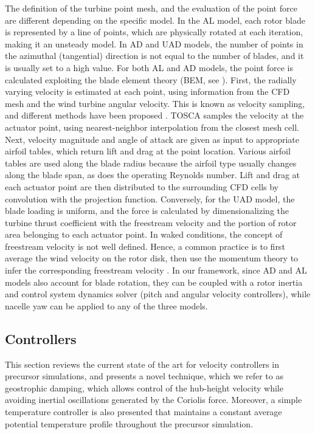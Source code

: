 \documentclass[journal abbreviation, manuscript]{copernicus}
\begin{document}
The definition of the turbine point mesh, and the evaluation of the point force are different depending on the specific model. In the AL model, each rotor blade is represented by a line of points, which are physically rotated at each iteration, making it an unsteady model. In AD and UAD models, the number of points in the azimuthal (tangential) direction is not equal to the number of blades, and it is usually set to a high value. For both AL and AD models, the point force is calculated exploiting the blade element theory (BEM, see \citealp{1935_Glauert}). First, the radially varying velocity is estimated at each point, using information from the CFD mesh and the wind turbine angular velocity. This is known as velocity sampling, and different methods have been proposed \citep{2017_Churchfield}. TOSCA samples the velocity at the actuator point, using nearest-neighbor interpolation from the closest mesh cell. Next, velocity magnitude and angle of attack are given as input to appropriate airfoil tables, which return lift and drag at the point location. Various airfoil tables are used along the blade radius because the airfoil type usually changes along the blade span, as does the operating Reynolds number. Lift and drag at each actuator point are then distributed to the surrounding CFD cells by convolution with the projection function. Conversely, for the UAD model, the blade loading is uniform, and the force is calculated by dimensionalizing the turbine thrust coefficient with the freestream velocity and the portion of rotor area belonging to each actuator point. In waked conditions, the concept of freestream velocity is not well defined. Hence, a common practice is to first average the wind velocity on the rotor disk, then use the momentum theory to infer the corresponding freestream velocity \citep{2010_MeyersMeneveau}. In our framework, since AD and AL models also account for blade rotation, they can be coupled with a rotor inertia and control system dynamics solver (pitch and angular velocity controllers), while nacelle yaw can be applied to any of the three models. 

\subsection{Controllers}
\label{subsec:controllers}
This section reviews the current state of the art for velocity controllers in precursor simulations, and presents a novel technique, which we refer to as geostrophic damping, which allows control of the hub-height velocity while avoiding inertial oscillations generated by the Coriolis force. Moreover, a simple temperature controller is also presented that maintains a constant average potential temperature profile throughout the precursor simulation. 
\end{document}
